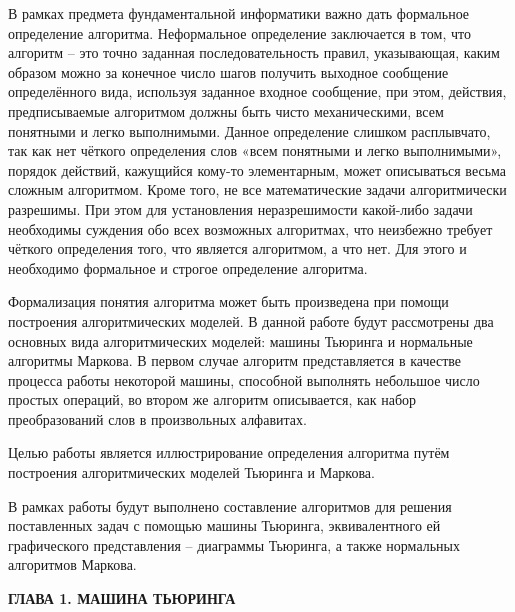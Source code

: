 \documentclass{article}
\begin{document}
В рамках предмета фундаментальной информатики важно дать формальное определение алгоритма. Неформальное определение заключается в том, что алгоритм – это точно заданная последовательность правил, указывающая, каким образом можно за конечное число шагов получить выходное сообщение определённого вида, используя заданное входное сообщение, при этом, действия, предписываемые алгоритмом должны быть чисто механическими, всем понятными и легко выполнимыми. Данное определение слишком расплывчато, так как нет чёткого определения слов «всем понятными и легко выполнимыми», порядок действий, кажущийся кому-то элементарным, может описываться весьма сложным алгоритмом. Кроме того, не все математические задачи алгоритмически разрешимы. При этом для установления неразрешимости какой-либо задачи необходимы суждения обо всех возможных алгоритмах, что неизбежно требует чёткого определения того, что является алгоритмом, а что нет. Для этого и необходимо формальное и строгое определение алгоритма.\\
\par Формализация понятия алгоритма может быть произведена при помощи построения алгоритмических моделей. В данной работе будут рассмотрены два основных вида алгоритмических моделей: машины Тьюринга и нормальные алгоритмы Маркова. В первом случае алгоритм представляется в качестве процесса работы некоторой машины, способной выполнять небольшое число простых операций, во втором же алгоритм описывается, как набор преобразований слов в произвольных алфавитах.\\

\par Целью работы является иллюстрирование определения алгоритма путём построения алгоритмических моделей Тьюринга и Маркова.\\
\par В рамках работы будут выполнено составление алгоритмов для решения поставленных задач с помощью машины Тьюринга, эквивалентного ей графического представления – диаграммы Тьюринга, а также нормальных алгоритмов Маркова.\\


\pagestyle{plain} %

\vspace{5cm}

\begin{center}
    \textbf{ГЛАВА 1. МАШИНА ТЬЮРИНГА}\\
\end{center}
\end{document}
